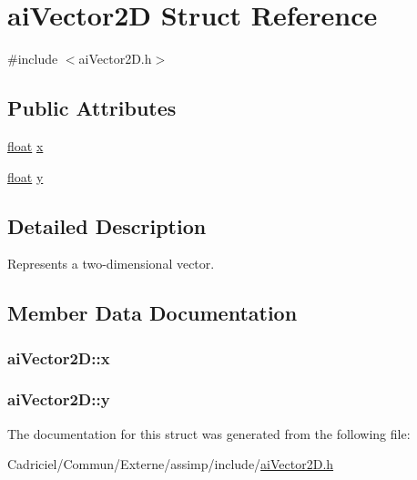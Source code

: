 \hypertarget{structai_vector2_d}{\section{ai\-Vector2\-D Struct Reference}
\label{structai_vector2_d}
}


{\ttfamily \#include $<$ai\-Vector2\-D.\-h$>$}

\subsection*{Public Attributes}
\begin{DoxyCompactItemize}
\item 
\hyperlink{fmod_8h_aeb841aa4b4b5f444b5d739d865b420af}{float} \hyperlink{structai_vector2_d_a968e4db235e054f58b4c320576d82740}{x}
\item 
\hyperlink{fmod_8h_aeb841aa4b4b5f444b5d739d865b420af}{float} \hyperlink{structai_vector2_d_a7bb1686f941459496627a3b8ce68e73f}{y}
\end{DoxyCompactItemize}


\subsection{Detailed Description}
Represents a two-\/dimensional vector. 

\subsection{Member Data Documentation}
\hypertarget{structai_vector2_d_a968e4db235e054f58b4c320576d82740}{
\subsubsection[{x}]{ ai\-Vector2\-D\-::x}}\label{structai_vector2_d_a968e4db235e054f58b4c320576d82740}
\hypertarget{structai_vector2_d_a7bb1686f941459496627a3b8ce68e73f}{
\subsubsection[{y}]{ ai\-Vector2\-D\-::y}}\label{structai_vector2_d_a7bb1686f941459496627a3b8ce68e73f}


The documentation for this struct was generated from the following file\-:\begin{DoxyCompactItemize}
\item 
Cadriciel/\-Commun/\-Externe/assimp/include/\hyperlink{ai_vector2_d_8h}{ai\-Vector2\-D.\-h}\end{DoxyCompactItemize}

